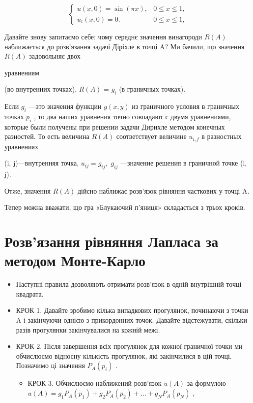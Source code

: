 \documentclass[
  ukrainian,
]{article}
\providecommand{\tightlist}{%
  \setlength{\itemsep}{0pt}\setlength{\parskip}{0pt}}
\begin{document}
\[
\begin{cases} u(x, 0) = \sin(\pi x), & 0 \le x \le 1, \\ u_t(x, 0) = 0. & 0 \le x \le 1, \end{cases}
\]

Давайте знову запитаємо себе: чому середнє значення винагороди \(R(A)\)
наближається до розв'язання задачі Діріхле в точці A? Ми бачили, що
значення \(R(A)\) задовольняє двох

уравнениям

(во внутренних точках), \(R(A)\) = \(g_i\) (в граничных точках).

Если \(g_i\) ---это значения функции \(g(x, y)\) из граничного условия в
граничных точках \(p_i\) , то два наших уравнения точно совпадают с
двумя уравнениями, которые были получены при решении задачи Дирихле
методом конечных разностей. То есть величина \(R(A)\) соответствует
величине \(u_{i,f}\) в разностных уравнениях

(i, j)---внутренняя точка, \(u_{ij} = g_{ij},\) \(g_{ij}\) ---значение
решения в граничной точке (i, j).

Отже, значення \(R(A)\) дійсно наближає розв'язок рівняння часткових у
точці A.

Тепер можна вважати, що гра «Блукаючий п'яниця» складається з трьох
кроків.

\section{Розв'язання рівняння Лапласа за методом
Монте-Карло}\label{ux440ux43eux437ux432ux44fux437ux430ux43dux43dux44f-ux440ux456ux432ux43dux44fux43dux43dux44f-ux43bux430ux43fux43bux430ux441ux430-ux437ux430-ux43cux435ux442ux43eux434ux43eux43c-ux43cux43eux43dux442ux435-ux43aux430ux440ux43bux43e}

\begin{itemize}
\tightlist
\item
  Наступні правила дозволяють отримати розв'язок в одній внутрішній
  точці квадрата.
\item
  КРОК 1. Давайте зробимо кілька випадкових прогулянок, починаючи з
  точки A і закінчуючи однією з прикордонних точок. Давайте
  відстежувати, скільки разів прогулянки закінчувалися на кожній межі.
\item
  КРОК 2. Після завершення всіх прогулянок для кожної граничної точки ми
  обчислюємо відносну кількість прогулянок, які закінчилися в цій точці.
  Позначимо ці значення \(P_A(p_i)\) .

  \begin{itemize}
  \tightlist
  \item
    КРОК 3. Обчислюємо наближений розв'язок \(u(A)\) за формулою
    \(u(A) = g_1 P_A(p_1) + g_2 P_A(p_2) + \dots + g_N P_A(p_N)\) ,
  \end{itemize}
\end{itemize}
\end{document}
